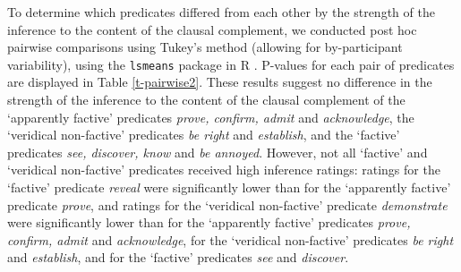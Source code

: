 \documentclass[11pt,fleqn]{article}
\newcommand{\6}{\mbox{$[\hspace*{-.6mm}[$}}
\newcommand{\9}{\mbox{$]\hspace*{-.6mm}]$}}
\begin{document}
To determine which predicates differed from each other by the strength of the inference to the content of the clausal complement, we conducted post hoc pairwise comparisons using Tukey's method (allowing for by-participant variability), using the \verb|lsmeans| package \citep{tukey} in R \citep{r}. P-values for each pair of predicates are displayed in Table \ref{t-pairwise2}. These results suggest no difference in the strength of the inference to the content of the clausal complement of the `apparently factive' predicates {\em prove, confirm, admit} and {\em acknowledge}, the `veridical non-factive' predicates {\em be right} and {\em establish}, and the `factive' predicates {\em see, discover, know} and {\em be annoyed}. However, not all `factive' and `veridical non-factive' predicates received high inference ratings: ratings for the `factive' predicate {\em reveal} were significantly lower than for the `apparently factive' predicate {\em prove}, and ratings for the `veridical non-factive' predicate {\em demonstrate} were significantly lower than for the `apparently factive' predicates {\em prove, confirm, admit} and {\em acknowledge}, for the `veridical non-factive' predicates {\em be right} and {\em establish}, and for the `factive' predicates {\em see} and {\em discover}. 
\end{document}
